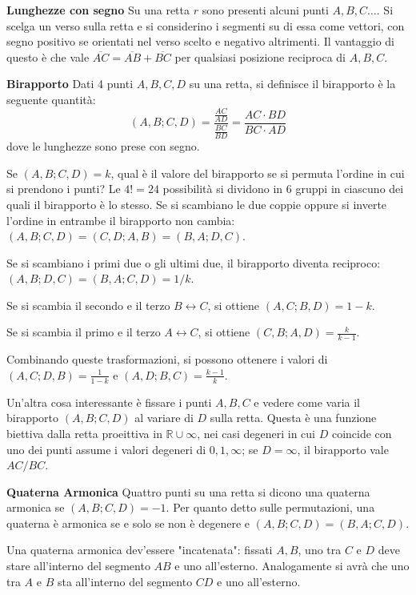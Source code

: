 \vspace{0.3cm}
\textbf{Lunghezze con segno} Su una retta $r$ sono presenti alcuni punti $A,B,C\ldots$. Si scelga un verso sulla retta e si considerino i segmenti su di essa come vettori, con segno positivo se orientati nel verso scelto e negativo altrimenti. Il vantaggio di questo è che vale $\overline{AC}=\overline{AB}+\overline{BC}$ per qualsiasi posizione reciproca di $A,B,C$.

\vspace{0.3cm}
\textbf{Birapporto} Dati 4 punti $A,B,C,D$ su una retta, si definisce il birapporto è la seguente quantità:
$$(A,B;C,D)=\frac{\frac{AC}{AD}}{\frac{BC}{BD}}=\frac{AC\cdot BD}{BC\cdot AD}$$
dove le lunghezze sono prese con segno.

\vspace{0.3cm}
Se $(A,B;C,D)=k$, qual è il valore del birapporto se si permuta l'ordine in cui si prendono i punti? Le $4!=24$ possibilità si dividono in $6$ gruppi in ciascuno dei quali il birapporto è lo stesso. Se si scambiano le due coppie oppure si inverte l'ordine in entrambe il birapporto non cambia: $(A,B;C,D)=(C,D;A,B)=(B,A;D,C)$.

Se si scambiano i primi due o gli ultimi due, il birapporto diventa reciproco: $(A,B;D,C)=(B,A;C,D)=1/k$.

Se si scambia il secondo e il terzo $B \leftrightarrow C$, si ottiene $(A,C;B,D)=1-k$.

Se si scambia il primo e il terzo $A \leftrightarrow C$, si ottiene $(C,B;A,D)=\frac{k}{k-1}$.


Combinando queste trasformazioni, si possono ottenere i valori di $(A,C;D,B)=\frac{1}{1-k}$ e $(A,D;B,C)=\frac{k-1}{k}$.

Un'altra cosa interessante è fissare i punti $A,B,C$ e vedere come varia il birapporto $(A,B;C,D)$ al variare di $D$ sulla retta. Questa è una funzione biettiva dalla retta proeittiva in $\mathbb{R}\cup\infty$, nei casi degeneri in cui $D$ coincide con uno dei punti assume i valori degeneri di $0,1,\infty$; se $D=\infty$, il birapporto vale $AC/BC$.

\vspace{0.3cm}
\textbf{Quaterna Armonica} Quattro punti su una retta si dicono una quaterna armonica se $(A,B;C,D)=-1$. Per quanto detto sulle permutazioni, una quaterna è armonica se e solo se non è degenere e $(A,B;C,D)=(B,A;C,D)$.

Una quaterna armonica dev'essere "incatenata": fissati $A,B$, uno tra $C$ e $D$ deve stare all'interno del segmento $AB$ e uno all'esterno. Analogamente si avrà che uno tra $A$ e $B$ sta all'interno del segmento $CD$ e uno all'esterno.

